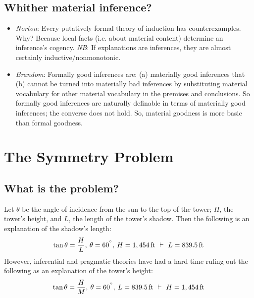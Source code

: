\documentclass[11pt]{article}
\begin{document}
\subsection{Whither material inference?}
\begin{itemize}
	\item \textit{Norton}: Every putatively formal theory of induction has counterexamples. Why? Because local facts (i.e. about material content) determine an inference's cogency. 
	\subitem \textit{NB}: If explanations are inferences, they are almost certainly inductive/nonmonotonic.
	\item \textit{Brandom}: Formally good inferences are: (a) materially good inferences that (b) cannot be turned into materially bad inferences by substituting material vocabulary for other material vocabulary in the premises and conclusions. So formally good inferences are naturally definable in terms of materially good inferences; the converse does not hold. So, material goodness is more basic than formal goodness.
\end{itemize}

\section{The Symmetry Problem}
\subsection{What is the problem?}
Let $\theta$ be the angle of incidence from the sun to the top of the tower; $H$, the tower's height, and $L$, the length of the tower's shadow. Then the following is an explanation of the shadow's length: \begin{equation}
\tan \theta  = \frac{H}{L},\hspace{.5ex} \theta = 60^{\degree},\hspace{.5ex} H = 1,454\,\text{ft} \,\,\vdash\,\, L = 839.5\,\text{ft}
\end{equation}
However, inferential and pragmatic theories have had a hard time ruling out the following as an explanation of the tower's height:
\begin{equation}
\tan \theta  = \frac{H}{M},\hspace{.5ex} \theta = 60^{\degree},\hspace{.5ex}  L = 839.5\,\text{ft} \,\,\vdash\,\,  H = 1,454\,\text{ft}
\end{equation}
\end{document}
